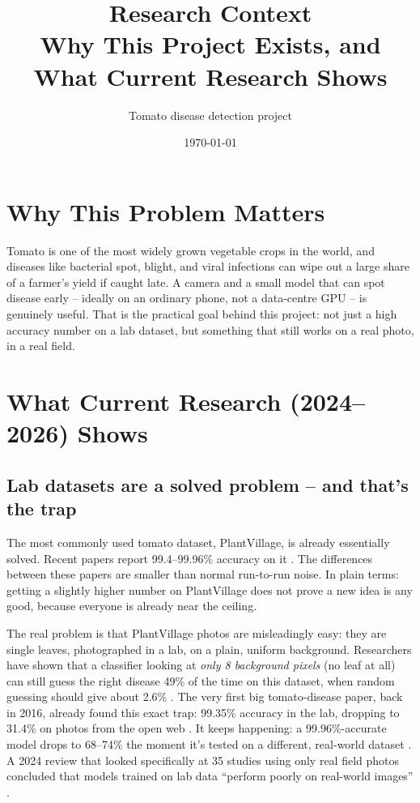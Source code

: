 \documentclass[11pt,a4paper]{article}
\title{\textbf{Research Context}\\[4pt]
\large Why This Project Exists, and What Current Research Shows}
\author{Tomato disease detection project}
\date{\today}
\begin{document}
\maketitle
\tableofcontents
\newpage

\section{Why This Problem Matters}
Tomato is one of the most widely grown vegetable crops in the world, and diseases like
bacterial spot, blight, and viral infections can wipe out a large share of a farmer's
yield if caught late. A camera and a small model that can spot disease early -- ideally
on an ordinary phone, not a data-centre GPU -- is genuinely useful. That is the practical
goal behind this project: not just a high accuracy number on a lab dataset, but something
that still works on a real photo, in a real field.

\section{What Current Research (2024--2026) Shows}

\subsection{Lab datasets are a solved problem -- and that's the trap}
The most commonly used tomato dataset, PlantVillage, is already essentially solved.
Recent papers report 99.4--99.96\% accuracy on it \cite{salman2025}. The differences
between these papers are smaller than normal run-to-run noise. In plain terms: getting a
slightly higher number on PlantVillage does not prove a new idea is any good, because
everyone is already near the ceiling.

The real problem is that PlantVillage photos are misleadingly easy: they are single
leaves, photographed in a lab, on a plain, uniform background. Researchers have shown
that a classifier looking at \emph{only 8 background pixels} (no leaf at all) can still
guess the right disease 49\% of the time on this dataset, when random guessing should
give about 2.6\% \cite{noyan2022}. The very first big tomato-disease paper, back in 2016,
already found this exact trap: 99.35\% accuracy in the lab, dropping to 31.4\% on photos
from the open web \cite{mohanty2016}. It keeps happening: a 99.96\%-accurate model drops
to 68--74\% the moment it's tested on a different, real-world dataset
\cite{salman2025}. A 2024 review that looked specifically at 35 studies using only real
field photos concluded that models trained on lab data ``perform poorly on real-world
images'' \cite{jelali2024}.
\end{document}
